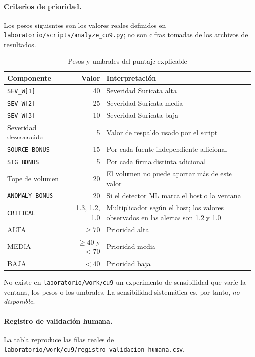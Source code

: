 \paragraph{Criterios de prioridad.}
Los pesos siguientes son los valores reales definidos en \texttt{laboratorio/scripts/analyze\_cu9.py}; no son cifras tomadas de los archivos de resultados.

\begin{table}[H]
\caption{Pesos y umbrales del puntaje explicable}
\label{tab:c9_criterios}
\centering
\footnotesize
\renewcommand{\arraystretch}{1.2}
\begin{tabularx}{\textwidth}{@{}l r X@{}}
\toprule
\textbf{Componente} & \textbf{Valor} & \textbf{Interpretación} \\
\midrule
\texttt{SEV\_W[1]} & 40 & Severidad Suricata alta \\
\texttt{SEV\_W[2]} & 25 & Severidad Suricata media \\
\texttt{SEV\_W[3]} & 10 & Severidad Suricata baja \\
Severidad desconocida & 5 & Valor de respaldo usado por el script \\
\texttt{SOURCE\_BONUS} & 15 & Por cada fuente independiente adicional \\
\texttt{SIG\_BONUS} & 5 & Por cada firma distinta adicional \\
Tope de volumen & 20 & El volumen no puede aportar más de este valor \\
\texttt{ANOMALY\_BONUS} & 20 & Si el detector ML marca el host o la ventana \\
\texttt{CRITICAL} & 1.3, 1.2, 1.0 & Multiplicador según el host; los valores observados en las alertas son 1.2 y 1.0 \\
\midrule
ALTA & $\geq 70$ & Prioridad alta \\
MEDIA & $\geq 40$ y $<70$ & Prioridad media \\
BAJA & $<40$ & Prioridad baja \\
\bottomrule
\end{tabularx}
\end{table}

No existe en \texttt{laboratorio/work/cu9} un experimento de sensibilidad que varíe la ventana, los pesos o los umbrales. La sensibilidad sistemática es, por tanto, \emph{no disponible}.

\paragraph{Registro de validación humana.}
La tabla reproduce las filas reales de \texttt{laboratorio/work/cu9/registro\_validacion\_humana.csv}.

